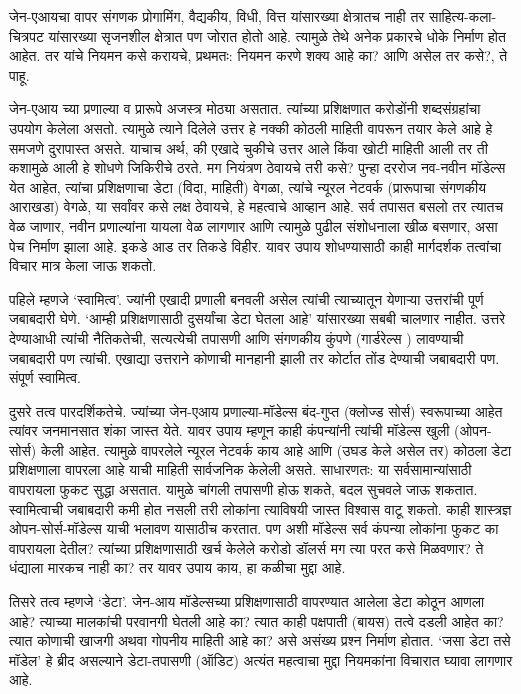 जेन-एआयचा वापर संगणक प्रोगामिंग, वैद्यकीय, विधी, वित्त यांसारख्या क्षेत्रातच नाही तर साहित्य-कला-चित्रपट यांसारख्या सृजनशील क्षेत्रात पण जोरात होतो आहे. त्यामुळे तेथे अनेक प्रकारचे धोके निर्माण होत आहेत. तर यांचे नियमन कसे करायचे, प्रथमतः: नियमन करणे शक्य आहे का? आणि असेल तर कसे?, ते पाहू.

जेन-एआय च्या प्रणाल्या व प्रारूपे अजस्त्र मोठ्या असतात. त्यांच्या प्रशिक्षणात करोडोंनी शब्दसंग्रहांचा उपयोग केलेला असतो. त्यामुळे त्याने दिलेले उत्तर हे नक्की कोठली माहिती वापरून तयार केले आहे हे समजणे दुरापास्त असते. याचाच अर्थ, की एखादे चुकीचे उत्तर आले किंवा खोटी माहिती आली तर ती कशामुळे आली हे शोधणे जिकिरीचे ठरते. मग नियंत्रण ठेवायचे तरी कसे? पुन्हा दररोज नव-नवीन मॉडेल्स येत आहेत, त्यांचा प्रशिक्षणाचा डेटा (विदा, माहिती) वेगळा, त्यांचे न्यूरल नेटवर्क (प्रारूपाचा संगणकीय आराखडा) वेगळे, या सर्वांवर कसे लक्ष ठेवायचे, हे महत्वाचे आव्हान आहे. सर्व तपासत बसलो तर त्यातच वेळ जाणार, नवीन प्रणाल्यांना यायला वेळ लागणार आणि त्यामुळे पुढील संशोधनाला खीळ बसणार, असा पेच निर्माण झाला आहे. इकडे आड तर तिकडे विहीर. यावर उपाय शोधण्यासाठी काही मार्गदर्शक तत्वांचा विचार मात्र केला जाऊ शकतो.

पहिले म्हणजे ‘स्वामित्व’. ज्यांनी एखादी प्रणाली बनवली असेल त्यांची त्याच्यातून येणाऱ्या उत्तरांची पूर्ण जबाबदारी घेणे. ‘आम्ही प्रशिक्षणासाठी दुसर्यांचा डेटा घेतला आहे’ यांसारख्या सबबी चालणार नाहीत. उत्तरे देण्याआधी त्यांची नैतिकतेची, सत्यत्येची तपासणी आणि संगणकीय कुंपणे (गार्डरेल्स ) लावण्याची जबाबदारी पण त्यांची. एखाद्या उत्तराने कोणाची मानहानी झाली तर कोर्टात तोंड देण्याची जबाबदारी पण. संपूर्ण स्वामित्व.

दुसरे तत्व पारदर्शिकतेचे. ज्यांच्या जेन-एआय प्रणाल्या-मॉडेल्स बंद-गुप्त (क्लोज्ड सोर्स) स्वरूपाच्या आहेत त्यांवर जनमानसात शंका जास्त येते. यावर उपाय म्हणून काही कंपन्यांनी त्यांची मॉडेल्स खुली (ओपन-सोर्स) केली आहेत. त्यामुळे वापरलेले न्यूरल नेटवर्क काय आहे आणि (उघड केले असेल तर) कोठला डेटा प्रशिक्षणाला वापरला आहे याची माहिती सार्वजनिक केलेली असते. साधारणतः: या सर्वसामान्यांसाठी वापरायला फुकट सुद्धा असतात. यामुळे चांगली तपासणी होऊ शकते, बदल सुचवले जाऊ शकतात. स्वामित्वाची जबाबदारी कमी होत नसली तरी लोकांना त्याविषयी जास्त विश्वास वाटू शकतो. काही शास्त्रज्ञ ओपन-सोर्स-मॉडेल्स याची भलावण यासाठीच करतात. पण अशी मॉडेल्स सर्व कंपन्या लोकांना फुकट का वापरायला देतील? त्यांच्या प्रशिक्षणासाठी खर्च केलेले करोडो डॉलर्स मग त्या परत कसे मिळवणार? ते धंद्याला मारकच नाही का? तर यावर उपाय काय, हा कळीचा मुद्दा आहे.

तिसरे तत्व म्हणजे ‘डेटा’. जेन-आय मॉडेल्सच्या प्रशिक्षणासाठी वापरण्यात आलेला डेटा कोठून आणला आहे? त्याच्या मालकांची परवानगी घेतली आहे का? त्यात काही पक्षपाती (बायस) तत्वे दडली आहेत का? त्यात कोणाची खाजगी अथवा गोपनीय माहिती आहे का? असे असंख्य प्रश्न निर्माण होतात. ‘जसा डेटा तसे मॉडेल’ हे ब्रीद असल्याने डेटा-तपासणी (ऑडिट) अत्यंत महत्वाचा मुद्दा नियमकांना विचारात घ्यावा लागणार आहे.

